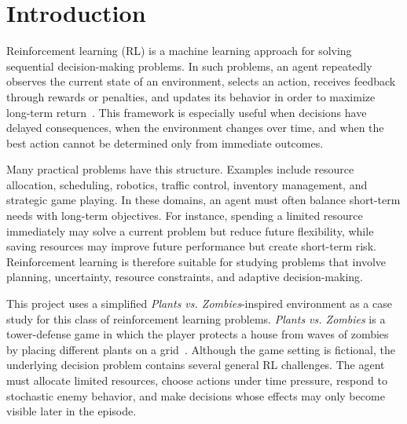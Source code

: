 \documentclass[conference,onecolumn]{IEEEtran}
\begin{document}
\section{Introduction}
\label{sec:introduction}
 

Reinforcement learning (RL) is a machine learning approach for solving sequential decision-making problems. In such problems, an agent repeatedly observes the current state of an environment, selects an action, receives feedback through rewards or penalties, and updates its behavior in order to maximize long-term return~\cite{sutton1998reinforcement}. This framework is especially useful when decisions have delayed consequences, when the environment changes over time, and when the best action cannot be determined only from immediate outcomes.

Many practical problems have this structure. Examples include resource allocation, scheduling, robotics, traffic control, inventory management, and strategic game playing. In these domains, an agent must often balance short-term needs with long-term objectives. For instance, spending a limited resource immediately may solve a current problem but reduce future flexibility, while saving resources may improve future performance but create short-term risk. Reinforcement learning is therefore suitable for studying problems that involve planning, uncertainty, resource constraints, and adaptive decision-making.

This project uses a simplified \textit{Plants vs. Zombies}-inspired environment as a case study for this class of reinforcement learning problems. \textit{Plants vs. Zombies} is a tower-defense game in which the player protects a house from waves of zombies by placing different plants on a grid~\cite{pvz_ea_official}. Although the game setting is fictional, the underlying decision problem contains several general RL challenges. The agent must allocate limited resources, choose actions under time pressure, respond to stochastic enemy behavior, and make decisions whose effects may only become visible later in the episode.
\end{document}
